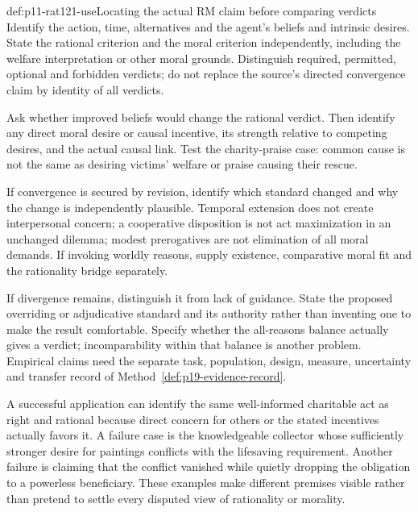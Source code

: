\begin{hbmethod}{def:p11-rat121-use}{Locating the actual RM claim before comparing verdicts}
Identify the action, time, alternatives and the agent's beliefs
and intrinsic desires. State the rational criterion and the
moral criterion independently, including the welfare interpretation
or other moral grounds. Distinguish required, permitted, optional
and forbidden verdicts; do not replace the source's directed
convergence claim by identity of all verdicts.

Ask whether improved beliefs would change the rational verdict.
Then identify any direct moral desire or causal incentive, its
strength relative to competing desires, and the actual causal link.
Test the charity-praise case: common cause is not the same as
desiring victims' welfare or praise causing their rescue.

If convergence is secured by revision, identify which standard
changed and why the change is independently plausible. Temporal
extension does not create interpersonal concern; a cooperative
disposition is not act maximization in an unchanged dilemma;
modest prerogatives are not elimination of all moral demands.
If invoking worldly reasons, supply existence, comparative moral
fit and the rationality bridge separately.

If divergence remains, distinguish it from lack of guidance.
State the proposed overriding or adjudicative standard and its
authority rather than inventing one to make the result comfortable.
Specify whether the all-reasons balance actually gives a verdict;
incomparability within that balance is another problem.
Empirical claims need the separate task, population, design,
measure, uncertainty and transfer record of
Method~\ref{def:p19-evidence-record}.
\end{hbmethod}

A successful application can identify the same well-informed
charitable act as right and rational because direct concern for
others or the stated incentives actually favors it. A failure
case is the knowledgeable collector whose sufficiently stronger
desire for paintings conflicts with the lifesaving requirement.
Another failure is claiming that the conflict vanished while
quietly dropping the obligation to a powerless beneficiary.
These examples make different premises visible rather than
pretend to settle every disputed view of rationality or morality.

